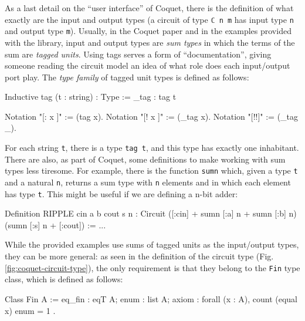 \documentclass[a4paper]{article}
\begin{document}
                As a last detail on the ``user interface'' of Coquet, there is the definition of
                what exactly are the input and output types (a circuit of type \texttt{ℂ n m} has
                input type \texttt{n} and output type \texttt{m}). Usually, in the Coquet
                paper\cite{coquet2011} and in the examples provided with the library, input and
                output types are \emph{sum types} in which the terms of the sum are \emph{tagged
                    units}. Using tags serves a form of ``documentation'', giving someone reading
                the circuit model an idea of what role does each input/output port play. The
                \emph{type family} of tagged unit types is defined as follows:
                \begin{coqcode}
        Inductive tag (t : string) : Type := _tag : tag t

        Notation "[: x ]" := (tag x).
        Notation "[! x ]" := (_tag x).
        Notation "[!!]"   := (_tag _).
                \end{coqcode}

                For each string \texttt{t}, there is a type \texttt{tag t}, and this type has
                exactly one inhabitant. There are also, as part of Coquet, some definitions to make
                working with sum types less tiresome. For example, there is the function
                \texttt{sumn} which, given a type \texttt{t} and a natural \texttt{n}, returns a
                sum type with \texttt{n} elements and in which each element has type \texttt{t}.
                This might be useful if we are defining a n-bit adder:
                \begin{coqcode}
        Definition RIPPLE cin a b cout s n :
            Circuit  ([:cin] + sumn [:a] n + sumn [:b] n)  (sumn [:s] n + [:cout]) := ...
                \end{coqcode}

                While the provided examples use sums of tagged units as the input/output types, they
                can be more general: as seen in the definition of the circuit type (Fig.
                \ref{fig:coquet-circuit-type}), the only requirement is that they belong to the
                \texttt{Fin} type class, which is defined as follows:

                \begin{coqcode}
        Class Fin A := {
            eq_fin : eqT A;
            enum   : list A;
            axiom  : forall (x : A), count (equal x) enum = 1
        }.
                \end{coqcode}
\end{document}
